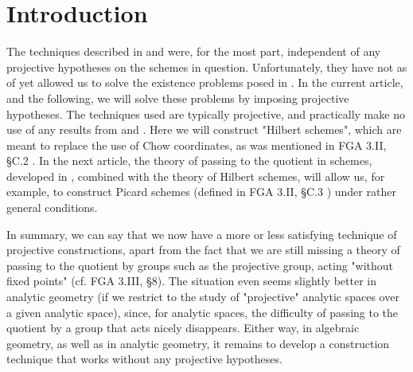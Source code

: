 \section{Introduction}\label{fga3.iv-introduction}

The techniques described in  and  were, for the most part, independent of any projective hypotheses on the schemes in question.
Unfortunately, they have not as of yet allowed us to solve the existence problems posed in .
In the current article, and the following, we will solve these problems by imposing projective hypotheses.
The techniques used are typically projective, and practically make no use of any results from  and .
Here we will construct "Hilbert schemes", which are meant to replace the use of Chow coordinates, as was mentioned in FGA 3.II, §C.2 .
In the next article, the theory of passing to the quotient in schemes, developed in , combined with the theory of Hilbert schemes, will allow us, for example, to construct Picard schemes (defined in FGA 3.II, §C.3 ) under rather general conditions.

In summary, we can say that we now have a more or less satisfying technique of projective constructions, apart from the fact that we are still missing a theory of passing to the quotient by groups such as the projective group, acting "without fixed points" (cf. FGA 3.III, §8).
The situation even seems slightly better in analytic geometry (if we restrict to the study of "projective" analytic spaces over a given analytic space), since, for analytic spaces, the difficulty of passing to the quotient by a group that acts nicely disappears.
Either way, in algebraic geometry, as well as in analytic geometry, it remains to develop a construction technique that works without any projective hypotheses.